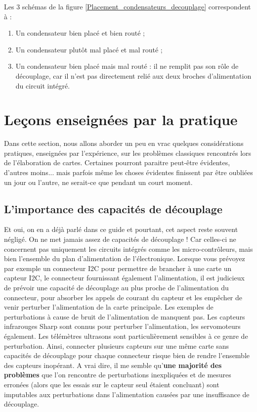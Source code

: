 \documentclass[a4paper]{article}
\begin{document}
Les 3 schémas de la figure \ref{Placement_condensateurs_decouplage} correspondent à :

\begin{enumerate}
	\item Un condensateur bien placé et bien routé ;
	\item Un condensateur plutôt mal placé et mal routé ;
	\item Un condensateur bien placé mais mal routé : il ne remplit pas son rôle de découplage, car il n'est pas directement relié aux deux broches d'alimentation du circuit intégré.
\end{enumerate}

\section{Leçons enseignées par la pratique}

Dans cette section, nous allons aborder un peu en vrac quelques considérations pratiques, enseignées par l'expérience, sur les problèmes classiques rencontrés lors de l'élaboration de cartes. Certaines pourront paraitre peut-être évidentes, d'autres moins... mais parfois même les choses évidentes finissent par être oubliées un jour ou l'autre, ne serait-ce que pendant un court moment.

\subsection{L'importance des capacités de découplage}

Et oui, on en a déjà parlé dans ce guide et pourtant, cet aspect reste souvent négligé. On ne met jamais assez de capacités de découplage ! Car celles-ci ne concernent pas uniquement les circuits intégrés comme les micro-contrôleurs, mais bien l'ensemble du plan d'alimentation de l'électronique. Lorsque vous prévoyez par exemple un connecteur I2C pour permettre de brancher à une carte un capteur I2C, le connecteur fournissant également l'alimentation, il est judicieux de prévoir une capacité de découplage au plus proche de l'alimentation du connecteur, pour absorber les appels de courant du capteur et les empêcher de venir perturber l'alimentation de la carte principale. Les exemples de perturbations à cause de bruit de l'alimentation de manquent pas. Les capteurs infrarouges Sharp sont connus pour perturber l'alimentation, les servomoteurs également. Les télémètres ultrasons sont particulièrement sensibles à ce genre de perturbation. Ainsi, connecter plusieurs capteurs sur une même carte sans capacités de découplage pour chaque connecteur risque bien de rendre l'ensemble des capteurs inopérant. A vrai dire, il me semble qu'\textbf{une majorité des problèmes} que l'on rencontre de perturbations inexpliquées et de mesures erronées (alors que les essais sur le capteur seul étaient concluant) sont imputables aux perturbations dans l'alimentation causées par une insuffisance de découplage.
\end{document}

